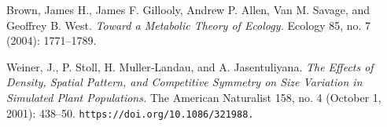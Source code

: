 \documentclass[11pt, a4paper]{article}
\begin{document}
\begin{thebibliography}{9}
 Brown, James H., James F. Gillooly, Andrew P. Allen, Van M. Savage, and Geoffrey B. West. \textit{Toward a Metabolic Theory of Ecology.} Ecology 85, no. 7 (2004): 1771–1789.

 Weiner, J., P. Stoll, H. Muller‐Landau, and A. Jasentuliyana. \textit{The Effects of Density, Spatial Pattern, and Competitive Symmetry on Size Variation in Simulated Plant Populations.} The American Naturalist 158, no. 4 (October 1, 2001): 438–50. \texttt{https://doi.org/10.1086/321988.}

\end{thebibliography}
\end{document}
